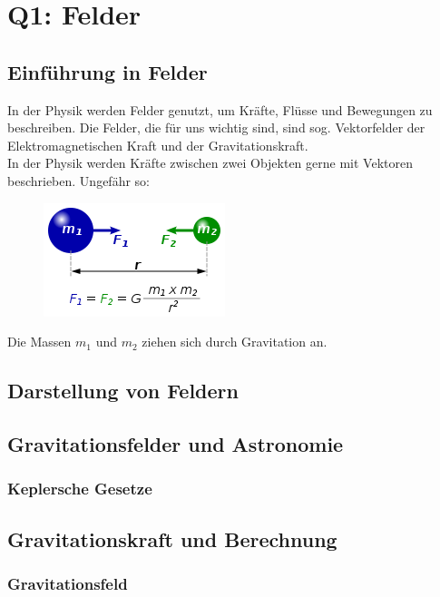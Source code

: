 \documentclass{article}
\begin{document}
    \section{Q1: Felder}

        \subsection{Einführung in Felder}
            In der Physik werden Felder genutzt, um Kräfte, Flüsse und Bewegungen zu beschreiben.
            Die Felder, die für uns wichtig sind, sind sog. Vektorfelder der Elektromagnetischen Kraft
            und der Gravitationskraft. \\
            In der Physik werden Kräfte zwischen zwei Objekten gerne mit Vektoren beschrieben. Ungefähr so:
            \begin{figure}[h] \label{figure3: Gravitationskraft} \includegraphics{graphics/universalGravitation.png}\end{figure}   
            Die Massen $m_1$ und $ m_2 $ ziehen sich durch Gravitation an.
        \subsection{Darstellung von Feldern}

            

        \subsection{Gravitationsfelder und Astronomie}

            \subsubsection{Keplersche Gesetze}

            \subsection{Gravitationskraft und Berechnung}

            \subsubsection{Gravitationsfeld}
\end{document}
